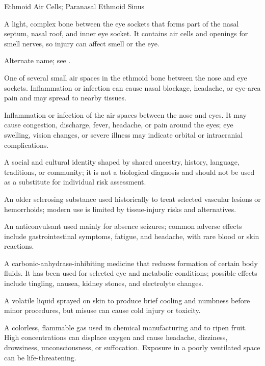 \synonyms
Ethmoid Air Cells; Paranasal Ethmoid Sinus

 A light, complex bone between the eye sockets that forms part of the nasal septum, nasal roof, and inner eye socket. It contains air cells and openings for smell nerves, so injury can affect smell or the eye.

 Alternate name; see .

 One of several small air spaces in the ethmoid bone between the nose and eye sockets. Inflammation or infection can cause nasal blockage, headache, or eye-area pain and may spread to nearby tissues.

 Inflammation or infection of the air spaces between the nose and eyes. It may cause congestion, discharge, fever, headache, or pain around the eyes; eye swelling, vision changes, or severe illness may indicate orbital or intracranial complications.

 A social and cultural identity shaped by shared ancestry, history, language, traditions, or community; it is not a biological diagnosis and should not be used as a substitute for individual risk assessment.

 An older sclerosing substance used historically to treat selected vascular lesions or hemorrhoids; modern use is limited by tissue-injury risks and alternatives.

 An anticonvulsant used mainly for absence seizures; common adverse effects include gastrointestinal symptoms, fatigue, and headache, with rare blood or skin reactions.

 A carbonic-anhydrase-inhibiting medicine that reduces formation of certain body fluids. It has been used for selected eye and metabolic conditions; possible effects include tingling, nausea, kidney stones, and electrolyte changes.

 A volatile liquid sprayed on skin to produce brief cooling and numbness before minor procedures, but misuse can cause cold injury or toxicity.

 A colorless, flammable gas used in chemical manufacturing and to ripen fruit. High concentrations can displace oxygen and cause headache, dizziness, drowsiness, unconsciousness, or suffocation. Exposure in a poorly ventilated space can be life-threatening.

